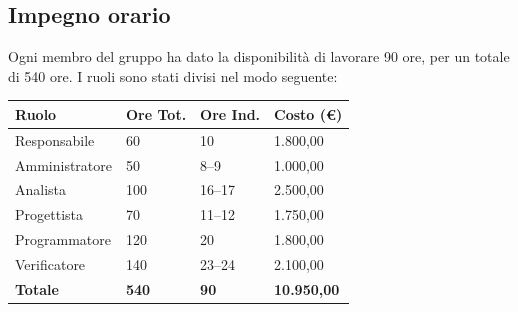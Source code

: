 \documentclass[a4paper,10pt]{article}
\begin{document}
\subsection*{Impegno orario}
Ogni membro del gruppo ha dato la disponibilità di lavorare 90 ore, per un totale di 540 ore. I ruoli sono stati divisi nel modo seguente:
\begin{table}[h!]
\centering
\begin{tabular}{|p{2.7cm}|M{1.6cm}|M{1.6cm}|p{2.1cm}|}
  \hline
  \textbf{Ruolo} & \textbf{Ore Tot.} & \textbf{Ore Ind.} &  \textbf\textbf{Costo (€)} \\
  \hline
  Responsabile & 60 & 10 & 1.800,00\\
  \hline
  Amministratore & 50 & 8--9 & 1.000,00\\
  \hline
  Analista & 100 & 16--17 & 2.500,00\\
  \hline
  Progettista & 70 & 11--12 & 1.750,00\\
  \hline
  Programmatore & 120 & 20 & 1.800,00\\
  \hline
  Verificatore & 140 & 23--24 & 2.100,00\\
  \hline
  \textbf{Totale} & \textbf{540} & \textbf{90} & \textbf{10.950,00}\\
  \hline
\end{tabular}
\end{table}

\newpage
\end{document}
